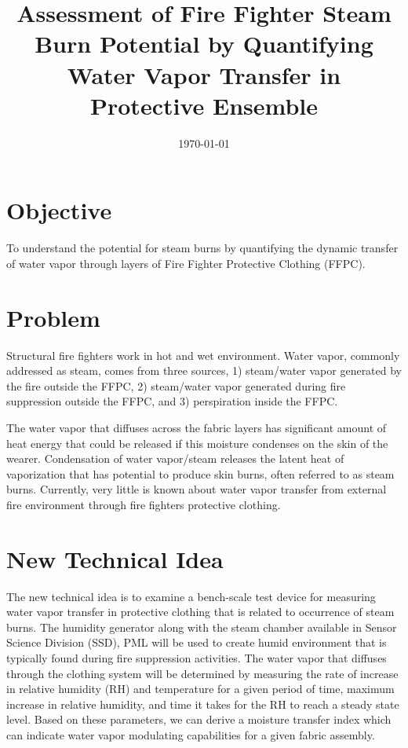 \documentclass[12pt,letterpaper]{article}
\title{Assessment of Fire Fighter Steam Burn Potential by Quantifying Water Vapor Transfer in Protective Ensemble}
\date{\today}
\begin{document}
\maketitle

\section{Objective}
\label{sec:objective}

To understand the potential for steam burns by quantifying the dynamic transfer of water vapor through layers of Fire Fighter Protective Clothing (FFPC).

\section{Problem}
\label{sec:problem}

Structural fire fighters work in hot and wet environment.  Water vapor, commonly addressed as steam, comes from three sources, 1) steam/water vapor generated by the fire outside the FFPC, 2) steam/water vapor generated during fire suppression outside the FFPC, and 3) perspiration inside the FFPC.

The water vapor that diffuses across the fabric layers has significant amount of heat energy that could be released if this moisture condenses on the skin of the wearer.  Condensation of water vapor/steam releases the latent heat of vaporization that has potential to produce skin burns, often referred to as steam burns.  Currently, very little is known about water vapor transfer from external fire environment through fire fighters protective clothing.

\section{New Technical Idea}
\label{sec:tech_idea}

The new technical idea is to examine a bench-scale test device for measuring water vapor transfer in protective clothing that is related to occurrence of steam burns.  The humidity generator along with the steam chamber available in Sensor Science Division (SSD), PML will be used to create humid environment that is typically found during fire suppression activities.  The water vapor that diffuses through the clothing system will be determined by measuring the rate of increase in relative humidity (RH) and temperature for a given period of time, maximum increase in relative humidity, and time it takes for the RH to reach a steady state level.  Based on these parameters, we can derive a moisture transfer index which can indicate water vapor modulating capabilities for a given fabric assembly.  
\end{document}
